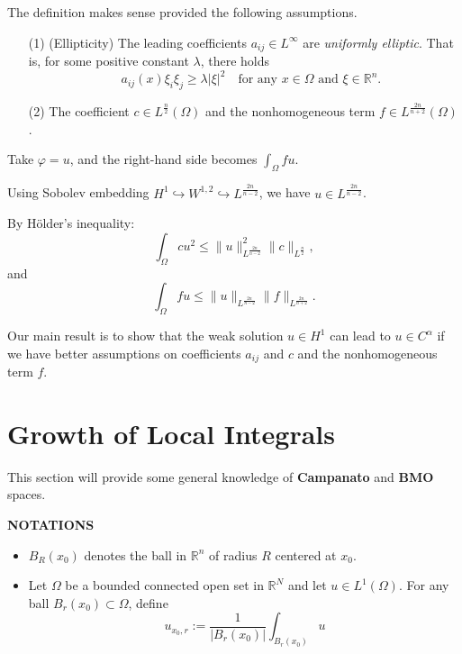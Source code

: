 \documentclass[oneside]{book}
\begin{document}
			The definition makes sense provided the following assumptions.
			\begin{itemize}
			\item[(1)] (Ellipticity) The leading coefficients $a_{ij} \in L^\infty$ are \textit{uniformly elliptic}. That is, for some positive constant \( \lambda \), there holds
			\[
			 \quad a_{ij}(x) \xi_i \xi_j \geq \lambda |\xi|^2 \quad \text{for any } x \in \Omega \text{ and } \xi \in \mathbb{R}^n.
			\]
			\item[(2)] The coefficient \( c \in L^{\frac{n}{2}}(\Omega) \) and the nonhomogeneous term \( f \in L^{\frac{2n}{n+2}}(\Omega) \).
			\end{itemize}
			
			Take \( \varphi = u \), and the right-hand side becomes \( \int_\Omega f u \).
			
			Using Sobolev embedding \( H^1 \hookrightarrow W^{1,2} \hookrightarrow L^{\frac{2n}{n-2}} \), we have \( u \in L^{\frac{2n}{n-2}} \).
			
			By Hölder's inequality:
			\[
			\int_\Omega c u^2 \leq \|u\|_{L^{\frac{2n}{n-2}}}^2 \|c\|_{L^{\frac{n}{2}}},
			\]
			and
			\[
			\int_\Omega f u \leq \|u\|_{L^{\frac{2n}{n-2}}} \|f\|_{L^{\frac{2n}{n+2}}}.
			\]
			
			Our main result is to show that the weak solution $u\in H^{1}$ can lead to $u\in C^{\alpha}$ if we have better assumptions on coefficients $a_{ij}$ and $c$ and the nonhomogeneous term $f$.
			\section{Growth of Local Integrals}
			This section will provide some general knowledge of \textbf{Campanato} and \textbf{BMO} spaces.
			
			\textbf{NOTATIONS}
			\begin{itemize}
				\item $B_{R}(x_{0})$ denotes the ball in $\mathbb{R}^{n}$ of radius $R$ centered at $x_{0}$.
				\item Let $\Omega$ be a bounded connected open set in $\mathbb{R}^{N}$ and let $u\in L^{1}(\Omega)$. For any ball $B_{r}(x_{0})\subset\Omega$, define\[ u_{x_{0},r} :=\dfrac{1}{|B_{r}(x_{0})|}\int_{B_{r}(x_{0})}u \]
			\end{itemize}
			
			
\end{document}
